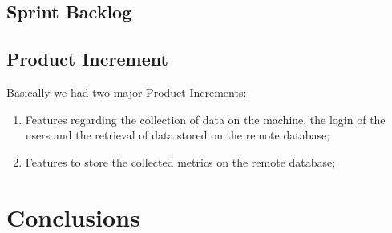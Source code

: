 \documentclass[a4paper,10pt]{report}
\begin{document}
\section{Sprint Backlog} %
\section{Product Increment} %
Basically we had two major Product Increments:
\begin{enumerate}
	\item Features regarding the collection of data on the machine, the login of the users and the retrieval of data stored on the remote database;
	\item Features to store the collected metrics on the remote database;
\end{enumerate}
	
\chapter{Conclusions} %
\end{document}
